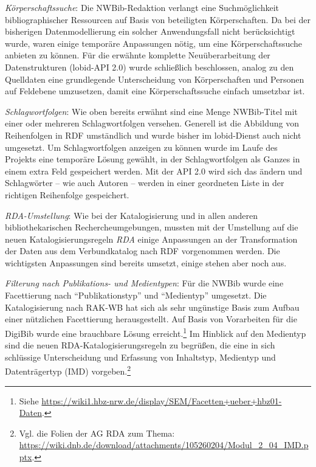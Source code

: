 \documentclass[a4paper,
fontsize=11pt,
oneside,
numbers=noperiodatend,
parskip=half-,
bibliography=totoc,
final
]{scrartcl}
\begin{document}
\emph{Körperschaftssuche}: Die NWBib-Redaktion verlangt eine
Suchmöglichkeit bibliographischer Ressourcen auf Basis von beteiligten
Körperschaften. Da bei der bisherigen Datenmodellierung ein solcher
Anwendungsfall nicht berücksichtigt wurde, waren einige temporäre
Anpassungen nötig, um eine Körperschaftssuche anbieten zu können. Für
die erwähnte komplette Neuüberarbeitung der Datenstrukturen (lobid-API
2.0) wurde schließlich beschlossen, analog zu den Quelldaten eine
grundlegende Unterscheidung von Körperschaften und Personen auf
Feldebene umzusetzen, damit eine Körperschaftssuche einfach umsetzbar
ist.

\emph{Schlagwortfolgen}: Wie oben bereits erwähnt sind eine Menge
NWBib-Titel mit einer oder mehreren Schlagwortfolgen versehen. Generell
ist die Abbildung von Reihenfolgen in RDF umständlich und wurde bisher
im lobid-Dienst auch nicht umgesetzt. Um Schlagwortfolgen anzeigen zu
können wurde im Laufe des Projekts eine temporäre Lösung gewählt, in der
Schlagwortfolgen als Ganzes in einem extra Feld gespeichert werden. Mit
der API 2.0 wird sich das ändern und Schlagwörter -- wie auch Autoren --
werden in einer geordneten Liste in der richtigen Reihenfolge
gespeichert.

\emph{RDA-Umstellung}: Wie bei der Katalogisierung und in allen anderen
bibliothekarischen Rechercheumgebungen, mussten mit der Umstellung auf
die neuen Katalogisierungsregeln \emph{RDA} einige Anpassungen an der
Transformation der Daten aus dem Verbundkatalog nach RDF vorgenommen
werden. Die wichtigsten Anpassungen sind bereits umsetzt, einige stehen
aber noch aus.

\emph{Filterung nach Publikations- und Medientypen}: Für die NWBib wurde
eine Facettierung nach \enquote{Publikationstyp} und \enquote{Medientyp}
umgesetzt. Die Katalogisierung nach RAK-WB hat sich als sehr ungünstige
Basis zum Aufbau einer nützlichen Facettierung herausgestellt. Auf Basis
von Vorarbeiten für die DigiBib wurde eine brauchbare Lösung
erreicht.\footnote{Siehe
  \url{https://wiki1.hbz-nrw.de/display/SEM/Facetten+ueber+hbz01-Daten}.}
Im Hinblick auf den Medientyp sind die neuen RDA-Katalogisierungsregeln
zu begrüßen, die eine in sich schlüssige Unterscheidung und Erfassung
von Inhaltstyp, Medientyp und Datenträgertyp (IMD) vorgeben.\footnote{Vgl.
  die Folien der AG RDA zum Thema:
  \url{https://wiki.dnb.de/download/attachments/105260204/Modul_2_04_IMD.pptx}.}
\end{document}

